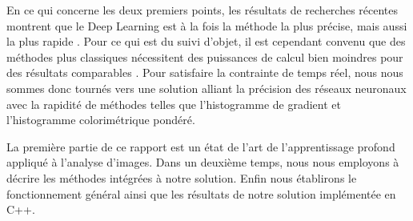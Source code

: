 	En ce qui concerne les deux premiers points, les résultats de recherches récentes montrent que le Deep Learning est à la fois la méthode la plus précise, mais aussi la plus rapide \cite{Bib_ilsvrc}. Pour ce qui est du suivi d’objet, il est cependant convenu que des méthodes plus classiques nécessitent des puissances de calcul bien moindres pour des résultats comparables \cite{Bib_votc}. Pour satisfaire la contrainte de temps réel, nous nous sommes donc tournés vers une solution alliant la précision des réseaux neuronaux avec la rapidité de méthodes telles que l’histogramme de gradient et l’histogramme colorimétrique pondéré. 
	
	La première partie de ce rapport est un état de l’art de l’apprentissage profond appliqué à l’analyse d’images. Dans un deuxième temps, nous nous employons à décrire les méthodes intégrées à notre solution. Enfin nous établirons le fonctionnement général ainsi que les résultats de notre solution implémentée en C++.